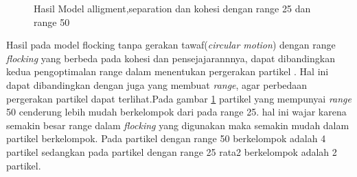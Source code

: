 \begin{figure}


\caption{Hasil Model alligment,separation dan kohesi dengan range 25 dan range 50}
\label{fig:2grafikmodel3gaya}
\end{figure}

Hasil pada model flocking tanpa gerakan tawaf(\textit{circular motion}) dengan range \textit{flocking} yang berbeda pada kohesi dan pensejajarannnya, dapat dibandingkan kedua pengoptimalan range dalam menentukan pergerakan partikel . Hal ini dapat dibandingkan dengan \citep{HUTH1992} juga yang membuat \textit{range}, agar perbedaan pergerakan partikel dapat terlihat.Pada gambar \ref{fig:2grafikmodel3gaya} partikel yang mempunyai \textit{range} 50 cenderung lebih mudah berkelompok  dari pada range 25. hal ini wajar karena semakin besar range dalam \textit{flocking} yang digunakan maka semakin mudah dalam partikel berkelompok. Pada partikel dengan range 50 berkelompok adalah 4 partikel 
sedangkan pada partikel dengan range 25 rata2 berkelompok adalah 2 partikel.

